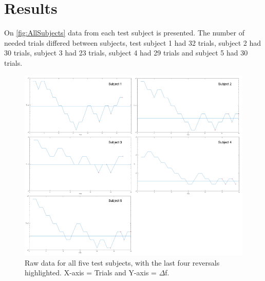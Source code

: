 \section*{Results}
On \autoref{fig:AllSubjects} data from each test subject is presented. The number of needed trials differed between subjects, test subject 1 had 32 trials, subject 2 had 30 trials, subject 3 had 23 trials, subject 4 had 29 trials and subject 5 had 30 trials.  
%
\begin{figure}[H]
\centering
\includegraphics[width = \textwidth]{Figure/AllSubjects.png} 
\caption{Raw data for all five test subjects, with the last four reversals highlighted. X-axis = Trials and Y-axis = $\Delta$f.}
\label{fig:AllSubjects}
\end{figure}
\noindent
% 